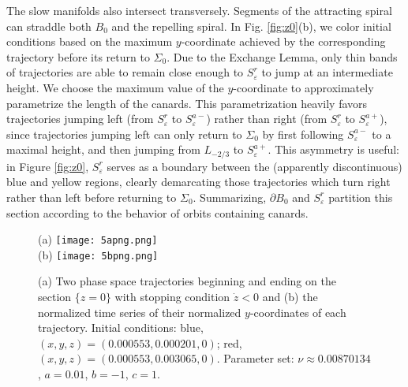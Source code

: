 \documentclass[aip, cha, sd, amsmath,amssymb, preprint]{revtex4-1}
\begin{document}
The slow manifolds also intersect transversely. Segments of the attracting spiral can straddle both $B_0$ and the repelling spiral. In Fig. \ref{fig:z0}(b), we color initial conditions based on the maximum $y$-coordinate achieved by the corresponding trajectory before its return to $\Sigma_0$.  Due to the Exchange Lemma, only thin bands of trajectories are able to remain close enough to $S^r_{ \varepsilon}$ to jump at an intermediate height. 
We choose the maximum value of the $y$-coordinate to approximately parametrize the length of the canards. This parametrization heavily favors trajectories jumping left (from $S^r_{ \varepsilon}$ to $S^{a-}_{ \varepsilon}$) rather than right (from $S^r_{ \varepsilon}$ to $S^{a+}_{ \varepsilon}$), since trajectories jumping left can only return to $\Sigma_0$ by first following $S^{a-}_{ \varepsilon}$ to a maximal height, and then jumping from $L_{-2/3}$ to $S^{a+}_{ \varepsilon}$. This asymmetry is useful: in Figure \ref{fig:z0}, $S^r_{ \varepsilon}$ serves as a boundary between the (apparently discontinuous) blue and yellow regions, clearly demarcating those trajectories which turn right rather than left before returning to $\Sigma_0$. Summarizing, $\partial B_0$ and $S^r_{ \varepsilon}$ partition this section according to the behavior of orbits containing canards. 

\begin{figure}
(a) \texttt{[image: 5apng.png]}\\
(b) \texttt{[image: 5bpng.png]}
\caption{\label{fig:sao}  (a) Two phase space trajectories beginning and ending on the section $\{z = 0\}$ with stopping condition $\dot{z} < 0$ and (b) the normalized time series of their normalized $y$-coordinates of each trajectory. Initial conditions: blue, $(x,y,z) = (0.000553, 0.000201, 0)$; red, $(x,y,z) = (0.000553, 0.003065, 0)$. Parameter set: $\nu \approx 0.00870134$, $a = 0.01$, $b = -1$, $c = 1$.}
\end{figure}
\end{document}
